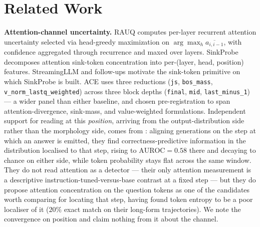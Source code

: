 \documentclass[10pt, letterpaper]{article}
\newcommand{\auroc}{\text{AUROC}}
\begin{document}
\section{Related Work}
\label{sec:related}

\textbf{Attention-channel uncertainty.} RAUQ
\citep{rauq2026anonymous} computes per-layer recurrent attention
uncertainty selected via head-greedy maximization on
$\arg\max_h \overline{a_{i,i-1}}$, with confidence aggregated through
recurrence and maxed over layers. SinkProbe
\citep{binkowski2026sinkprobe} decomposes attention sink-token
concentration into per-(layer, head, position) features. StreamingLLM
\citep{xiao2024streaming} and follow-ups motivate the sink-token
primitive on which SinkProbe is built. ACE uses three reductions
(\texttt{js}, \texttt{bos\_mass}, \texttt{v\_norm\_lastq\_weighted})
across three block depths (\texttt{final}, \texttt{mid},
\texttt{last\_minus\_1}) --- a wider panel than either baseline, and
chosen pre-registration to span attention-divergence, sink-mass, and
value-weighted formulations. Independent support for reading at this
\emph{position}, arriving from the output-distribution side rather than
the morphology side, comes from \citet{yeom2026commitment}: aligning
generations on the step at which an answer is emitted, they find
correctness-predictive information in the distribution localised to
that step, rising to $\auroc = 0.58$ there and decaying to chance on
either side, while token probability stays flat across the same window.
They do not read attention as a detector --- their only attention
measurement is a descriptive instruction-tuned-versus-base contrast at a
fixed step --- but they do propose attention concentration on the
question tokens as one of the candidates worth comparing for locating
that step, having found token entropy to be a poor localiser of it
($20\%$ exact match on their long-form trajectories). We note the
convergence on position and claim nothing from it about the channel.
\end{document}
